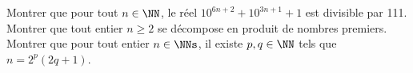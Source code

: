 %
%
	\begin{tasks}
		\task Montrer que pour tout $n\in \NN$, le réel $10^{6n+2}+10^{3n+1}+1$ est divisible par 111.
		\task Montrer que tout entier $n \ge 2$ se décompose en produit de nombres premiers.
		\task Montrer que pour tout entier $n \in \NNs$, il existe $p, q \in \NN$ tels que $n=2^p(2q+1)$.
		
	\end{tasks}
